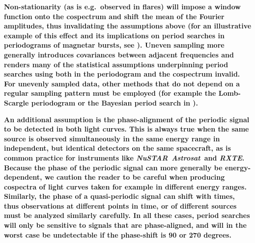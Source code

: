 \documentclass[12pt]{emulateapj}
\newcommand{\project}[1]{\textsl{#1}}
\newcommand{\nustar}{\project{NuSTAR}\xspace}
\newcommand{\rxte}{\project{RXTE}\xspace}
\newcommand{\astrosat}{\project{Astrosat}\xspace}
\begin{document}
\textbf{Non-stationarity (as is e.g.\ observed in flares) will impose a window function onto the cospectrum and shift the mean of the Fourier amplitudes, thus invalidating the assumptions above (for an illustrative example of this effect and its implications on period searches in periodograms of magnetar bursts, see \citealt{huppenkothen2013}). Uneven sampling more generally introduces covariances between adjacent frequencies and renders many of the statistical assumptions underpinning period searches using both in the periodogram and the cospectrum invalid. For unevenly sampled data, other methods that do not depend on a regular sampling pattern must be employed (for example the Lomb-Scargle periodogram \citep{lomb1976, scargle1982} or the Bayesian period search in \citet{gregory1992}).}

\textbf{An additional assumption is the phase-alignment of the periodic signal to be detected in both light curves. This is always true when the same source is observed simultaneously in the same energy range in independent, but identical detectors on the same spacecraft, as is common practice for instruments like \nustar\, \astrosat\ and \rxte. Because the phase of the periodic signal can more generally be energy-dependent, we caution the reader to be careful when producing cospectra of light curves taken for example in different energy ranges. Similarly, the phase of a quasi-periodic signal can shift with times, thus observations at different points in time, or of different sources must be analyzed similarly carefully. In all these cases, period searches will only be sensitive to signals that are phase-aligned, and will in the worst case be undetectable if the phase-shift is 90 or 270 degrees. }
\end{document}
